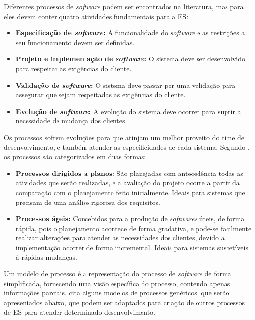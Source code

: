 Diferentes processos de \textit{software} podem ser encontrados na literatura, mas para  eles devem conter quatro atividades fundamentais para a ES:

\begin{itemize}
    \item \textbf{Especificação de \textit{software}:} A funcionalidade do \textit{software} e as restrições a seu funcionamento devem ser definidas.
    \item \textbf{Projeto e implementação de \textit{software}:} O sistema deve ser desenvolvido para respeitar as exigências do cliente. 
    \item \textbf{Validação de \textit{software}:} O sistema deve passar por uma validação para assegurar que sejam respeitadas as exigências do cliente.
    \item \textbf{Evolução de \textit{software}:} A evolução do sistema deve ocorrer para suprir a necessidade de mudança dos clientes. 
\end{itemize}


Os processos sofrem evoluções para que atinjam um melhor proveito do time de desenvolvimento, e também atender as especificidades de cada sistema. Segundo \cite{iansommerville}, os processos são categorizados em duas formas:

\begin{itemize}
    \item \textbf{Processos dirigidos a planos:} São planejadas com antecedência todas as atividades que serão realizadas, e a avaliação do projeto ocorre a partir da comparação com o planejamento feito inicialmente. Ideais para sistemas que precisam de uma análise rigorosa dos requisitos.
    \item \textbf{Processos ágeis:} Concebidos para a produção de \textit{softwares} úteis, de forma rápida, pois o planejamento acontece de forma gradativa, e pode-se facilmente realizar alterações para atender as necessidades dos clientes, devido a implementação ocorrer de forma incremental. Ideais para sistemas suscetíveis à rápidas mudanças.
\end{itemize}


Um modelo de processo é a representação do processo de \textit{software} de forma simplificada, fornecendo uma visão específica do processo, contendo apenas informações parciais. \cite{Pressman2011} cita alguns modelos de processos genéricos, que serão apresentados abaixo, que podem ser adaptados para criação de outros processos de ES para atender determinado desenvolvimento.

